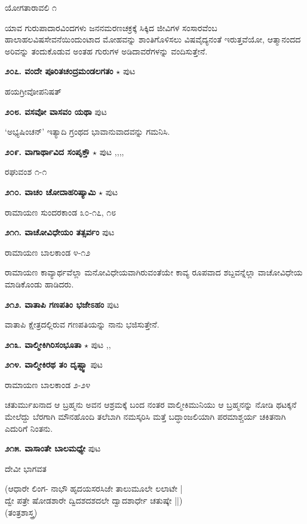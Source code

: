 {\hfill ಯೋಗತಾರಾವಲಿ ೧

ಯಾವ ಗುರುಪಾದಾರವಿಂದಗಳು ಜನನಮರಣಚಕ್ರಕ್ಕೆ  ಸಿಕ್ಕಿದ ಜೀವಿಗಳ ಸಂಸಾರವೆಂಬ ಹಾಲಾಹಲವಿಷಸೇವನೆಯಿಂದುಂಟಾದ ಮೋಹವನ್ನು ಶಾಂತಿಗೊಳಿಸಲು ವಿಷವೈದ್ಯನಂತೆ ಇರುತ್ತವೆಯೋ, ಆತ್ಮಾನಂದದ ಅರಿವನ್ನು ತಂದುಕೊಡುವ ಅಂತಹ ಗುರುಗಳ ಅಡಿದಾವರೆಗಳನ್ನು ವಂದಿಸುತ್ತೇನೆ.

\medskip
\noindent\textbf{೨೦೭. ವಂದೇ ಪೂರಿತಚಂದ್ರಮಂಡಲಗತಂ} $\star$ \hfill ಪುಟ \pageref{32a}

\hfill ಹಯಗ್ರೀವೋಪನಿಷತ್

\medskip
\noindent\textbf{೨೦೮. ವಸವೋ ವಾಸವಂ ಯಥಾ} \hfill ಪುಟ \pageref{250e}

\hfill `ಅಭ್ಯಷಿಂಚನ್' ಇತ್ಯಾದಿ ಗ್ರಂಥದ ಭಾವಾನುವಾದವನ್ನು ಗಮನಿಸಿ.

\medskip
\noindent\textbf{೨೦೯. ವಾಗಾರ್ಥಾವಿದ ಸಂಪೃಕ್ತೌ} $\star$ \hfill ಪುಟ \pageref{21b},\pageref{31b},\pageref{223a},\pageref{???},\pageref{238}

\hfill ರಘುವಂಶ ೧-೧

\medskip
\noindent\textbf{೨೧೦. ವಾಚಂ ಚೋದಾಹರಿಷ್ಯಾಮಿ} $\star$ \hfill ಪುಟ \pageref{232}

\hfill ರಾಮಾಯಣ ಸುಂದರಕಾಂಡ ೩೦-೧೭, ೧೮

\medskip
\noindent\textbf{೨೧೧. ವಾಚೋವಿಧೇಯಂ ತತ್ಸರ್ವಂ} \hfill ಪುಟ \pageref{189a}

\hfill ರಾಮಾಯಣ ಬಾಲಕಾಂಡ ೪-೧೨

ರಾಮಾಯಣ ಕಾವ್ಯಾರ್ಥವೆಲ್ಲಾ ಮನೋವಿಧೇಯವಾಗಿರುವಂತೆಯೇ ಕಾವ್ಯ ರೂಪವಾದ ಶಬ್ದವನ್ನೆಲ್ಲಾ ವಾಚೋವಿಧೇಯ ಮಾಡಿಕೊಂಡು ಹಾಡಿದರು.

\medskip
\noindent\textbf{೨೧೨. ವಾತಾಪಿ ಗಣಪತಿಂ ಭಜೇಽಹಂ} \hfill ಪುಟ \pageref{45}

\hfill ವಾತಾಪಿ ಕ್ಷೇತ್ರದಲ್ಲಿರುವ ಗಣಪತಿಯನ್ನು ನಾನು ಭಜಿಸುತ್ತೇನೆ.

\medskip
\noindent\textbf{೨೧೩. ವಾಲ್ಮೀಕಿಗಿರಿಸಂಭೂತಾ} $\star$ \hfill ಪುಟ \pageref{151a},\pageref{166b},\pageref{174}

\medskip
\noindent\textbf{೨೧೪. ವಾಲ್ಮೀಕಿರಥ ತಂ ದೃಷ್ಟ್ವಾ} \hfill ಪುಟ \pageref{202a}

\hfill ರಾಮಾಯಣ ಬಾಲಕಾಂಡ ೨-೨೪

ಚತುರ್ಮುಖನಾದ ಆ ಬ್ರಹ್ಮನು ಅವನ ಆಶ್ರಮಕ್ಕೆ ಬಂದ ನಂತರ ವಾಲ್ಮೀಕಿಮುನಿಯು ಆ ಬ್ರಹ್ಮನನ್ನು ನೋಡಿ ಥಟಕ್ಕನೆ ಮೇಲೆದ್ದು ಬೆರಗಾಗಿ ಮೌನಹೊಂದಿ  ತಲೆಬಾಗಿ ನಮಸ್ಕರಿಸಿ ಮತ್ತೆ ಬದ್ಧಾಂಜಲಿಯಾಗಿ ಪರಮಾಶ್ಚರ್ಯ ಚಕಿತನಾಗಿ ಎದುರಿಗೆ ನಿಂತನು.

\medskip
\noindent\textbf{೨೧೫. ವಾಸಾಂತೇ ಬಾಲಮಧ್ಯೇ} \hfill ಪುಟ \pageref{29}

\hfill ದೇವೀ ಭಾಗವತ

\begin{shloka}
(ಆಧಾರೇ ಲಿಂಗ- ನಾಭೌ ಹೃದಯಸರಸಿಜೇ ತಾಲುಮೂಲೇ ಲಲಾಟೇ |\\
ದ್ವೇ ಪತ್ರೇ ಷೋಡಶಾರೇ ದ್ವಿದಶದಶದಲೇ ದ್ವಾದಶಾರ್ಧೇ ಚತುಷ್ಕೇ ||)\\
\hfill (ತಂತ್ರಶಾಸ್ತ್ರ)
\end{shloka}

}
